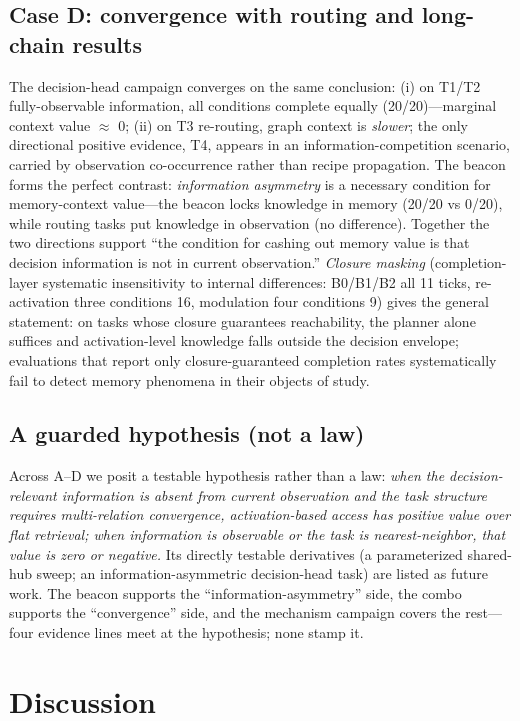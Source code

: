 \documentclass[10pt,a4paper]{article}
\begin{document}
\subsection{Case D: convergence with routing and long-chain results}
The decision-head campaign converges on the same conclusion: (i) on T1/T2 fully-observable information, all conditions complete equally (20/20)---marginal context value $\approx$ 0; (ii) on T3 re-routing, graph context is \emph{slower}; the only directional positive evidence, T4, appears in an information-competition scenario, carried by observation co-occurrence rather than recipe propagation. The beacon forms the perfect contrast: \emph{information asymmetry} is a necessary condition for memory-context value---the beacon locks knowledge in memory (20/20 vs 0/20), while routing tasks put knowledge in observation (no difference). Together the two directions support ``the condition for cashing out memory value is that decision information is not in current observation.'' \emph{Closure masking} (completion-layer systematic insensitivity to internal differences: B0/B1/B2 all 11 ticks, re-activation three conditions 16, modulation four conditions 9) gives the general statement: on tasks whose closure guarantees reachability, the planner alone suffices and activation-level knowledge falls outside the decision envelope; evaluations that report only closure-guaranteed completion rates systematically fail to detect memory phenomena in their objects of study.

\subsection{A guarded hypothesis (not a law)}
\label{sec:whydiff-hyp}
Across A--D we posit a testable hypothesis rather than a law: \emph{when the decision-relevant information is absent from current observation and the task structure requires multi-relation convergence, activation-based access has positive value over flat retrieval; when information is observable or the task is nearest-neighbor, that value is zero or negative.} Its directly testable derivatives (a parameterized shared-hub sweep; an information-asymmetric decision-head task) are listed as future work. The beacon supports the ``information-asymmetry'' side, the combo supports the ``convergence'' side, and the mechanism campaign covers the rest---four evidence lines meet at the hypothesis; none stamp it.

\section{Discussion}
\label{sec:discussion}
\end{document}
